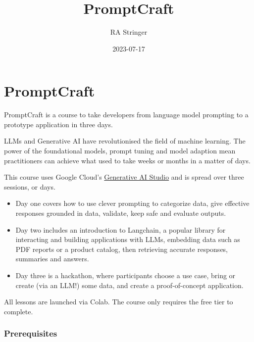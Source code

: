\documentclass[
  letterpaper,
  DIV=11,
  numbers=noendperiod]{scrreprt}
\title{PromptCraft}
\author{RA Stringer}
\date{2023-07-17}
\renewcommand*\contentsname{Table of contents}
\newcommand\contentsname{Table of contents}
\begin{document}
\maketitle
\ifdefined\Shaded\renewenvironment{Shaded}{\begin{tcolorbox}[sharp corners, borderline west={3pt}{0pt}{shadecolor}, frame hidden, interior hidden, boxrule=0pt, enhanced, breakable]}{\end{tcolorbox}}\fi

\renewcommand*\contentsname{Table of contents}
{
\hypersetup{linkcolor=}
\setcounter{tocdepth}{2}
\tableofcontents
}

\hypertarget{promptcraft}{%
\chapter{PromptCraft}\label{promptcraft}}

PromptCraft is a course to take developers from language model prompting
to a prototype application in three days.

LLMs and Generative AI have revolutionised the field of machine
learning. The power of the foundational models, prompt tuning and model
adaption mean practitioners can achieve what used to take weeks or
months in a matter of days.

This course uses Google Cloud's
\href{https://cloud.google.com/ai/generative-ai}{Generative AI Studio}
and is spread over three sessions, or days.

\begin{itemize}
\item
  Day one covers how to use clever prompting to categorize data, give
  effective responses grounded in data, validate, keep safe and evaluate
  outputs.
\item
  Day two includes an introduction to Langchain, a popular library for
  interacting and building applications with LLMs, embedding data such
  as PDF reports or a product catalog, then retrieving accurate
  responses, summaries and answers.
\item
  Day three is a hackathon, where participants choose a use case, bring
  or create (via an LLM!) some data, and create a proof-of-concept
  application.
\end{itemize}

All lessons are launched via Colab. The course only requires the free
tier to complete.

\hypertarget{prerequisites}{%
\subsection{Prerequisites}\label{prerequisites}}
\end{document}
